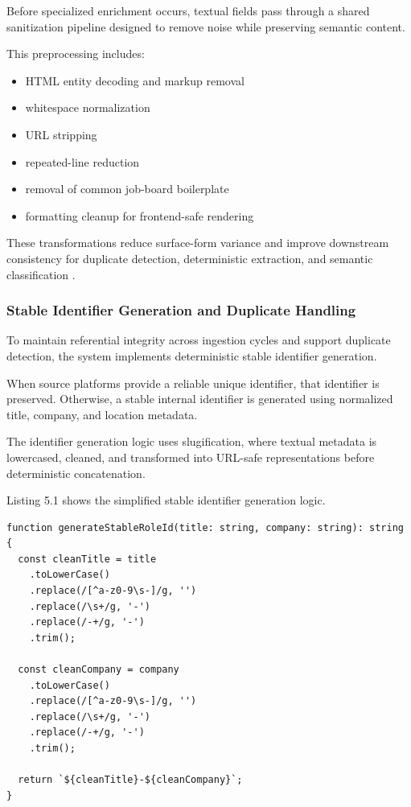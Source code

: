 Before specialized enrichment occurs, textual fields pass through a shared sanitization pipeline designed to remove noise while preserving semantic content.

This preprocessing includes:
\begin{itemize}[leftmargin=1.4em,itemsep=0.25em,topsep=0.25em]
\item HTML entity decoding and markup removal
\item whitespace normalization
\item URL stripping
\item repeated-line reduction
\item removal of common job-board boilerplate
\item formatting cleanup for frontend-safe rendering
\end{itemize}
These transformations reduce surface-form variance and improve downstream consistency for duplicate detection, deterministic extraction, and semantic classification \cite{batini2009methodologies, chu2016data}.

\subsubsection*{Stable Identifier Generation and Duplicate Handling}

To maintain referential integrity across ingestion cycles and support duplicate detection, the system implements deterministic stable identifier generation.

When source platforms provide a reliable unique identifier, that identifier is preserved. Otherwise, a stable internal identifier is generated using normalized title, company, and location metadata.

The identifier generation logic uses slugification, where textual metadata is lowercased, cleaned, and transformed into URL-safe representations before deterministic concatenation.

Listing 5.1 shows the simplified stable identifier generation logic.

\begin{lstlisting}[caption={Stable identifier generation logic}]
function generateStableRoleId(title: string, company: string): string {
  const cleanTitle = title
    .toLowerCase()
    .replace(/[^a-z0-9\s-]/g, '')
    .replace(/\s+/g, '-')
    .replace(/-+/g, '-')
    .trim();

  const cleanCompany = company
    .toLowerCase()
    .replace(/[^a-z0-9\s-]/g, '')
    .replace(/\s+/g, '-')
    .replace(/-+/g, '-')
    .trim();

  return `${cleanTitle}-${cleanCompany}`;
}
\end{lstlisting}

